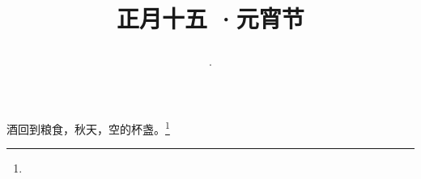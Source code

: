 \title{\date[d=24,m=2,y=2024][year:cn-y,年,month:cn,day:cn,日,·,weekday]·正月十五 ·元宵节}
酒回到粮食，秋天，空的杯盏。\footnote{ }

